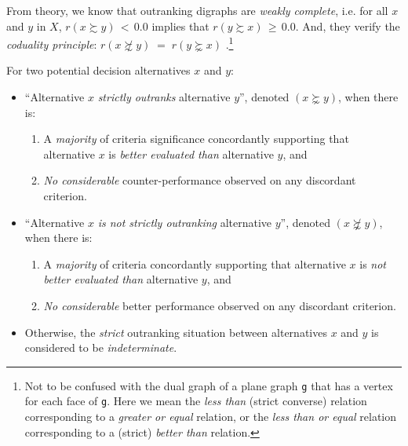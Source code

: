 From theory, we know that outranking digraphs are \emph{weakly complete}, i.e. for all $x$ and $y$ in $X$, $r(x \succsim y)\, <\, 0.0$ implies that $r(y \succsim x)\, \geq\, 0.0$. And, they verify the \emph{coduality principle}:  $r(x \not\succsim y) \;=\; r(y \succnsim x)$ \citep{BIS-2013}.\footnote{Not to be confused with the dual graph of a plane graph \texttt{g} that has a vertex for each face of \texttt{g}. Here we mean the \emph{less than} (strict converse) relation corresponding to a \emph{greater or equal} relation, or the \emph{less than or equal} relation corresponding to a (strict) \emph{better than} relation.}

\begin{definition}\label{def:strictOutranking}

\noindent For two potential decision alternatives $x$ and $y$:
\begin{itemize}[leftmargin=0.5cm,rightmargin=0.5cm]
\item ``Alternative $x$ \emph{strictly outranks} alternative $y$'', denoted $(x \succnsim y)$, when there is:
   \begin{enumerate}[topsep=0pt]
     \item A \emph{majority} of criteria significance concordantly supporting that alternative $x$ is \emph{better evaluated than} alternative $y$, and
     \item \emph{No considerable} counter-performance observed on any discordant criterion.      
    \end{enumerate}
\item ``Alternative $x$ \emph{is not strictly outranking} alternative $y$'', denoted $(x \not\succnsim y)$, when there is:
   \begin{enumerate}[topsep=0pt]
    \item A \emph{majority} of criteria concordantly supporting that alternative $x$ is \emph{not better evaluated than} alternative $y$, and
    \item \emph{No considerable} better performance observed on any discordant criterion. 
    \end{enumerate}
\item Otherwise, the \emph{strict} outranking situation between alternatives $x$ and $y$ is considered to be \emph{indeterminate}.
\end{itemize}
\end{definition}

